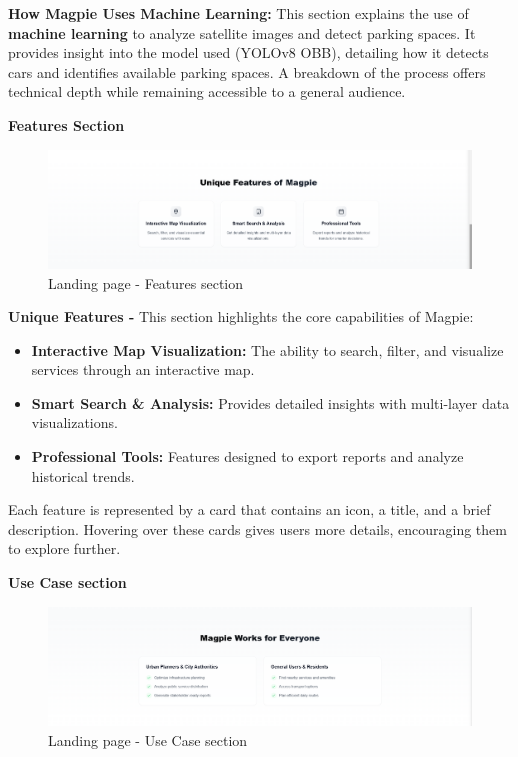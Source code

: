 \textbf{How Magpie Uses Machine Learning:} This section explains the use of \textbf{machine learning} to analyze satellite images and detect parking spaces. It provides insight into the model used (YOLOv8 OBB), detailing how it detects cars and identifies available parking spaces. A breakdown of the process offers technical depth while remaining accessible to a general audience.

\textbf{Features Section}

\begin{figure}[h]
    \centering{}
    \includegraphics[width=1\textwidth]{images/site/landing/landing_3_features.png}
    \caption{Landing page {-} Features section}
\end{figure}

\textbf{Unique Features {-} } This section highlights the core capabilities of Magpie:

\begin{itemize}
    \item{} \textbf{Interactive Map Visualization:} The ability to search, filter, and visualize services through an interactive map.
    \item{} \textbf{Smart Search \& Analysis:} Provides detailed insights with multi{-}layer data visualizations.
    \item{} \textbf{Professional Tools:} Features designed to export reports and analyze historical trends.
\end{itemize}

Each feature is represented by a card that contains an icon, a title, and a brief description. Hovering over these cards gives users more details, encouraging them to explore further.


\textbf{Use Case section}

\begin{figure}[h]
    \centering{}
    \includegraphics[width=1\textwidth]{images/site/landing/landing_4_usecases.png}
    \caption{Landing page {-} Use Case section}
\end{figure}

